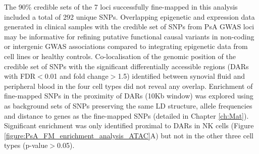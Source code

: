 The 90\% credible sets of the 7 loci successfully fine-mapped in this analysis included a total of 292 unique SNPs. Overlapping epigenetic and expression data generated in clinical samples with the credible set of SNPs from PsA GWAS loci may be informative for refining putative functional causal variants in non-coding or intergenic GWAS associations compared to integrating epigenetic data from cell lines or healthy controls. Co-localisation of the genomic position of the credible set of SNPs with the significant differentially accessible regions (DARs with FDR$<$0.01 and fold change$>$1.5) identified between synovial fluid and peripheral blood in the four cell types did not reveal any overlap. Enrichment of fine-mapped SNPs in the proximity of DARs (10Kb window) was explored using as background sets of SNPs preserving the same LD structure, allele frequencies and distance to genes as the fine-mapped SNPs (detailed in Chapter \ref{ch:Mat}). Significant enrichment was only identified proximal to DARs in NK cells (Figure \ref{figure:PsA_FM_enrichment_analysis_ATAC}A) but not in the other three cell types (p-value$>$0.05). 




